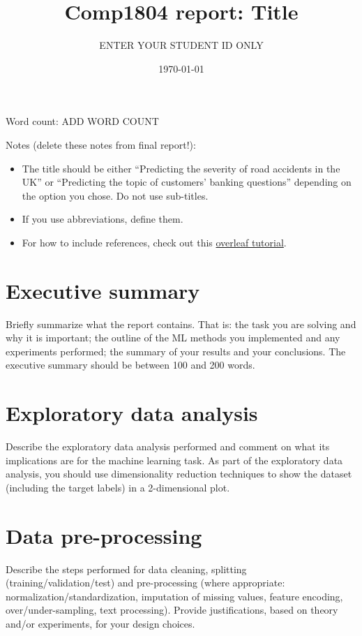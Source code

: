 \documentclass[12pt, a4paper]{article}
\title{Comp1804 report: Title}
\author{ENTER YOUR STUDENT ID ONLY }
\date{\today{}}
\begin{document}
\maketitle

Word count: ADD WORD COUNT   

\vspace{.2in}
Notes (delete these notes from final report!): 
\begin{itemize}
\item The title should be either ``Predicting the severity of road accidents in the UK'' or ``Predicting the topic of customers’ banking questions'' depending on the option you chose. Do not use sub-titles.
\item If you use abbreviations, define them.
\item For how to include references, check out this \href{https://www.overleaf.com/learn/latex/Natbib_citation_styles}{overleaf tutorial}.
\end{itemize}

\vspace{0.2in}


\section*{Executive summary}
Briefly summarize what the report contains. That is: the task you are solving and why it is important; the outline of the ML methods you implemented and any experiments performed; the summary of your results and your conclusions. The executive summary should be between 100 and 200 words.

\section{Exploratory data analysis}
Describe the exploratory data analysis performed and comment on what its implications are for the machine learning task. As part of the exploratory data analysis, you should use dimensionality reduction techniques to show the dataset (including the target labels) in a 2-dimensional plot.

\section{Data pre-processing}
Describe the steps performed for data cleaning, splitting (training/validation/test) and pre-processing (where appropriate: normalization/standardization, imputation of missing values, feature encoding, over/under-sampling, text processing). Provide justifications, based on theory and/or experiments, for your design choices.
\end{document}
